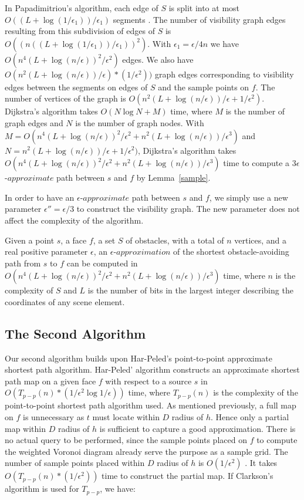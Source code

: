 \documentclass{llncs}
\begin{document}
In Papadimitriou's algorithm, each edge of $S$ is split into at most
$O((L+\log(1/\epsilon_1))/\epsilon_1)$ segments \cite{Pap85}.
The number of visibility graph edges resulting from this subdivision of edges of $S$ is
$O((n((L+\log(1/\epsilon_1))/\epsilon_1))^2)$. With $\epsilon_1=\epsilon/4n$ we have
$O(n^4(L+\log(n/\epsilon))^2/\epsilon^2)$ edges. We also have
$O(n^2(L+\log(n/\epsilon))/\epsilon)*(1/\epsilon^2))$ graph edges corresponding to visibility edges between
the segments on edges of $S$ and the sample points on $f$.
The number of vertices of the graph is $O(n^2(L+\log(n/\epsilon))/\epsilon+1/\epsilon^2)$. Dijkstra's algorithm takes
$O(N\log N +M)$ time, where $M$ is the number of graph edges and $N$ is the number of graph nodes. With $M= O(n^4(L+\log(n/\epsilon))^2/\epsilon^2+n^2(L+\log(n/\epsilon))/\epsilon^3)$ and $N=n^2(L+\log(n/\epsilon))/\epsilon+1/\epsilon^2)$, Dijkstra's algorithm takes $O(n^4(L+\log(n/\epsilon))^2/\epsilon^2+n^2(L+\log(n/\epsilon))/\epsilon^3)$ time to compute a $3\epsilon$-$approximate$ path between $s$ and $f$ by Lemma~\ref{sample}.

In order to have an $\epsilon$-$approximate$ path between $s$ and $f$, we simply use a new parameter $\epsilon ''=\epsilon/3$ to construct the visibility graph. The new parameter does not affect the complexity of the algorithm.

\begin{theorem}
Given a point $s$, a face $f$, a set $S$ of obstacles, with a total of $n$ vertices, and a real positive parameter $\epsilon$, an $\epsilon$-$approximation$ of
the shortest obstacle-avoiding path from $s$ to $f$ can be computed in
$O(n^4(L+\log(n/\epsilon))^2/\epsilon^2+n^2(L+\log(n/\epsilon))/\epsilon^3)$ time,
where $n$ is the complexity of $S$ and $L$ is the number of bits in the largest integer describing the coordinates of any scene element.
\end{theorem}

\subsection{The Second Algorithm}
Our second algorithm builds upon Har-Peled's point-to-point approximate shortest path algorithm. Har-Peled' algorithm constructs an approximate shortest path map on a given face $f$ with respect to a source $s$ in $O(T_{p-p}(n)*(1/\epsilon^2\log1/\epsilon))$ time, where $T_{p-p}(n)$ is the complexity of the point-to-point shortest path algorithm used. As mentioned previously, a full map on $f$ is unnecessary as $t$ must locate within $D$ radius of $h$. Hence only a partial map within $D$ radius of $h$ is sufficient to capture a good approximation. There is no actual query to be performed, since the sample points placed on $f$ to compute the weighted Voronoi diagram already serve the purpose as a sample grid. The number of sample points placed within $D$ radius of $h$ is $O(1/\epsilon^2)$ \cite{Sar99}. It takes $O(T_{p-p}(n)*(1/\epsilon^2))$ time to construct the partial map. If Clarkson's algorithm is used for $T_{p-p}$, we have:
\end{document}
